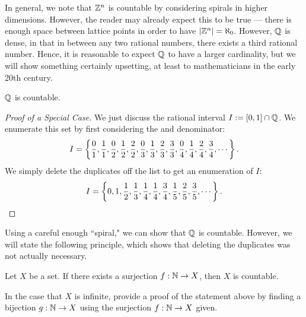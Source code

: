 \documentclass{article}
\begin{document}
In general, we note that $\mathbb Z^n$ is countable by considering spirals in higher dimensions. However, the reader may already expect this to be true --- there is enough space between lattice points in order to have $|\mathbb Z^n| = \aleph_0$. However, $\mathbb Q$ is dense, in that in between any two rational numbers, there exists a third rational number. Hence, it is reasonable to expect $\mathbb Q$ to have a larger cardinality, but we will show something certainly upsetting, at least to mathematicians in the early 20th century.
\begin{theorem}
$\mathbb Q$ is countable.
\end{theorem}
\begin{proof}[Proof of a Special Case]
We just discuss the rational interval $I := [0, 1] \cap \mathbb Q$. We enumerate this set by first considering the and denominator:
$$I = \left\{\frac 01, \frac 11, \frac 02, \frac 12, \frac 22, \frac 03, \frac 13, \frac 23, \frac 33, \frac 04, \frac 14, \frac 24, \frac 34, \cdots\right\}.$$
We simply delete the duplicates off the list to get an enumeration of $I$:
$$I = \left\{0, 1, \frac 12, \frac 13, \frac 14, \frac 14, \frac 34, \frac 15, \frac 25, \frac 35, \cdots\right\}.$$
\end{proof}
Using a careful enough ``spiral," we can show that $\mathbb Q$ is countable. However, we will state the following principle, which shows that deleting the duplicates was not actually necessary.

\begin{proposition}
Let $X$ be a set. If there exists a surjection $f: \mathbb N\to X$, then $X$ is countable.
\end{proposition}
\begin{exercise}
In the case that $X$ is infinite, provide a proof of the statement above by finding a bijection $g: \mathbb N\to X$ using the surjection $f: \mathbb N\to X$ given.
\end{exercise}
\end{document}
